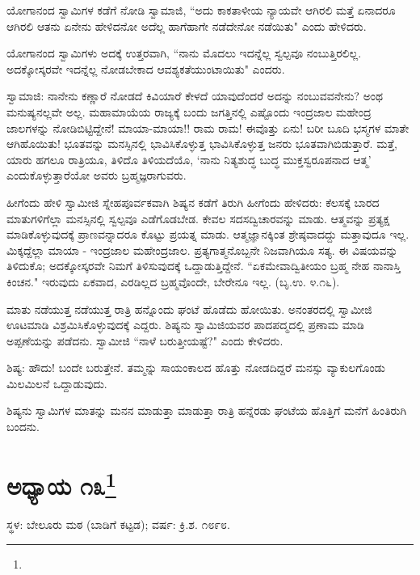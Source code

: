 ಯೋಗಾನಂದ ಸ್ವಾಮಿಗಳ ಕಡೆಗೆ ನೋಡಿ ಸ್ವಾಮಾಜಿ, “ಅದು ಕಾಕತಾಳೀಯ ನ್ಯಾಯವೇ ಆಗಿರಲಿ ಮತ್ತೆ ಏನಾದರೂ ಆಗಿರಲಿ ಆತನು ಏನೇನು ಹೇಳಿದನೋ ಅದೆಲ್ಲ ಹಾಗೆಹಾಗೇ ನಡೆದೇನೋ ನಡೆಯಿತು" ಎಂದು ಹೇಳಿದರು.

ಯೋಗಾನಂದ ಸ್ವಾಮಿಗಳು ಅದಕ್ಕೆ ಉತ್ತರವಾಗಿ, “ನಾನು ಮೊದಲು ಇದನ್ನೆಲ್ಲ ಸ್ವಲ್ಪವೂ ನಂಬುತ್ತಿರಲಿಲ್ಲ. ಅದಕ್ಕೋಸ್ಕರವೇ ಇದನ್ನೆಲ್ಲ ನೋಡಬೇಕಾದ ಆವಶ್ಯಕತೆಯುಂಟಾಯಿತು" ಎಂದರು.

ಸ್ವಾಮಾಜಿ: ನಾನೇನು ಕಣ್ಣಾರೆ ನೋಡದೆ ಕಿವಿಯಾರೆ ಕೇಳದೆ ಯಾವುದೆಂದರೆ ಅದನ್ನು ನಂಬುವವನೇನು? ಅಂಥ ಮನುಷ್ಯನಲ್ಲವೇ ಅಲ್ಲ. ಮಹಾಮಾಯೆಯ ರಾಜ್ಯಕ್ಕೆ ಬಂದು ಜಗತ್ತಿನಲ್ಲಿ ಎಷ್ಟೊಂದು ಇಂದ್ರಜಾಲ ಮಹೇಂದ್ರ ಜಾಲಗಳನ್ನು ನೋಡಿಬಿಟ್ಟಿದ್ದೇನೆ! ಮಾಯಾ-ಮಾಯಾ!! ರಾಮ ರಾಮ! ಈವೊತ್ತು ಏನು! ಬರೀ ಬೂದಿ ಭಸ್ಮಗಳ ಮಾತೇ ಆಗಿಹೊಯಿತು! ಭೂತವನ್ನು ಮನಸ್ಸಿನಲ್ಲಿ ಭಾವಿಸಿಕೊಳ್ಳುತ್ತ ಭಾವಿಸಿಕೊಳ್ಳುತ್ತ ಜನರು ಭೂತವಾಗಿಬಿಡುತ್ತಾರೆ. ಮತ್ತೆ, ಯಾರು ಹಗಲೂ ರಾತ್ರಿಯೂ, ತಿಳಿದೊ ತಿಳಿಯದೆಯೊ, ‘ನಾನು ನಿತ್ಯಶುದ್ಧ ಬುದ್ಧ ಮುಕ್ತಸ್ವರೂಪನಾದ ಆತ್ಮ’ ಎಂದುಕೊಳ್ಳುತ್ತಾರೆಯೋ ಅವರು ಬ್ರಹ್ಮಜ್ಞರಾಗುವರು.

ಹೀಗೆಂದು ಹೇಳಿ ಸ್ವಾಮೀಜಿ ಸ್ನೇಹಪೂರ್ವಕವಾಗಿ ಶಿಷ್ಯನ ಕಡೆಗೆ ತಿರುಗಿ ಹೀಗೆಂದು ಹೇಳಿದರು: ಕೆಲಸಕ್ಕೆ ಬಾರದ ಮಾತುಗಳಿಗೆಲ್ಲಾ ಮನಸ್ಸಿನಲ್ಲಿ ಸ್ವಲ್ಪವೂ ಎಡೆಗೊಡಬೇಡ. ಕೇವಲ ಸದಸದ್ವಿಚಾರವನ್ನು ಮಾಡು. ಆತ್ಮವನ್ನು ಪ್ರತ್ಯಕ್ಷ ಮಾಡಿಕೊಳ್ಳುವುದಕ್ಕೆ ಪ್ರಾಣವನ್ನಾದರೂ ಕೊಟ್ಟು ಪ್ರಯತ್ನ ಮಾಡು. ಆತ್ಮಜ್ಞಾನಕ್ಕಿಂತ ಶ್ರೇಷ್ಠವಾದದ್ದು ಮತ್ತಾವುದೂ ಇಲ್ಲ. ಮಿಕ್ಕದ್ದೆಲ್ಲಾ ಮಾಯಾ - ಇಂದ್ರಜಾಲ ಮಹೇಂದ್ರಜಾಲ. ಪ್ರತ್ಯಗಾತ್ಮನೊಬ್ಬನೇ ನಿಜವಾಗಿಯೂ ಸತ್ಯ. ಈ ವಿಷಯವನ್ನು ತಿಳಿದುಕೊ; ಅದಕ್ಕೋಸ್ಕರವೇ ನಿಮಗೆ ತಿಳಿಸುವುದಕ್ಕೆ ಒದ್ದಾಡುತ್ತಿದ್ದೇನೆ. “ಏಕಮೇವಾದ್ವಿತೀಯಂ ಬ್ರಹ್ಮ ನೇಹ ನಾನಾಸ್ತಿ ಕಿಂಚನ." ಇರುವುದು ಏಕವಾದ, ಎರಡಿಲ್ಲದ ಬ್ರಹ್ಮವೊಂದೇ, ಬೇರೇನೂ ಇಲ್ಲ. (ಬೃ.ಉ. ೪.೧೬).

ಮಾತು ನಡೆಯುತ್ತ ನಡೆಯುತ್ತ ರಾತ್ರಿ ಹನ್ನೊಂದು ಘಂಟೆ ಹೊಡೆದು ಹೋಯಿತು. ಅನಂತರದಲ್ಲಿ ಸ್ವಾಮೀಜಿ ಊಟಮಾಡಿ ವಿಶ್ರಮಿಸಿಕೊಳ್ಳುವುದಕ್ಕೆ ಎದ್ದರು. ಶಿಷ್ಯನು ಸ್ವಾಮಿಜಿಯವರ ಪಾದಪದ್ಮದಲ್ಲಿ ಪ್ರಣಾಮ ಮಾಡಿ ಅಪ್ಪಣೆಯನ್ನು ಪಡೆದನು. ಸ್ವಾಮೀಜಿ “ನಾಳೆ ಬರುತ್ತೀಯಷ್ಟೆ?" ಎಂದು ಕೇಳಿದರು.

ಶಿಷ್ಯ: ಹೌದು! ಬಂದೇ ಬರುತ್ತೇನೆ. ತಮ್ಮನ್ನು ಸಾಯಂಕಾಲದ ಹೊತ್ತು ನೋಡದಿದ್ದರೆ ಮನಸ್ಸು ವ್ಯಾಕುಲಗೊಂಡು ಮಿಲಮಿಲನೆ ಒದ್ದಾಡುವುದು.

ಶಿಷ್ಯನು ಸ್ವಾಮಿಗಳ ಮಾತನ್ನು ಮನನ ಮಾಡುತ್ತಾ ಮಾಡುತ್ತಾ ರಾತ್ರಿ ಹನ್ನೆರಡು ಘಂಟೆಯ ಹೊತ್ತಿಗೆ ಮನೆಗೆ ಹಿಂತಿರುಗಿ ಬಂದನು.

\newpage

\chapter[ಅಧ್ಯಾಯ ೧೩]{ಅಧ್ಯಾಯ ೧೩\protect\footnote{}}

\centerline{ಸ್ಥಳ: ಬೇಲೂರು ಮಠ (ಬಾಡಿಗೆ ಕಟ್ಟಡ); ವರ್ಷ: ಕ್ರಿ.ಶ. ೧೮೯೮.}


